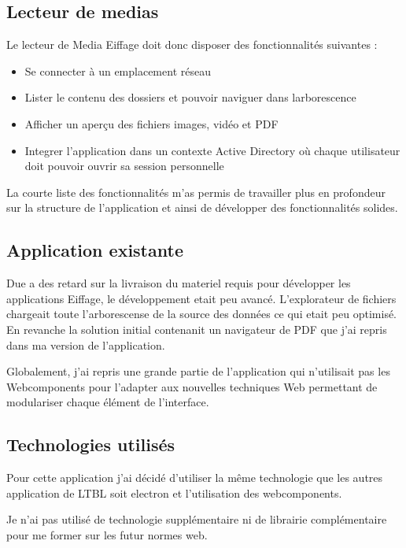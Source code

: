 \clearpage

\subsection{Lecteur de medias}

Le lecteur de Media Eiffage doit donc disposer des fonctionnalités suivantes :

\begin{itemize}
    \item Se connecter à un emplacement réseau
    \item Lister le contenu des dossiers et pouvoir naviguer dans larborescence
    \item Afficher un aperçu des fichiers images, vidéo et PDF
    \item Integrer l'application dans un contexte Active Directory où chaque utilisateur doit pouvoir ouvrir sa session personnelle
\end{itemize}

La courte liste des fonctionnalités m'as permis de travailler plus en profondeur sur la structure de l'application et ainsi de développer des fonctionnalités solides.

\subsection{Application existante}

Due a des retard sur la livraison du materiel requis pour développer les applications Eiffage, le développement etait peu avancé.
L'explorateur de fichiers chargeait toute l'arborescense de la source des données ce qui etait peu optimisé.
En revanche la solution initial contenanit un navigateur de PDF que j'ai repris dans ma version de l'application.

Globalement, j'ai repris une grande partie de l'application qui n'utilisait pas les Webcomponents pour l'adapter aux nouvelles techniques Web permettant de modulariser chaque élément de l'interface.

\subsection{Technologies utilisés}

Pour cette application j'ai décidé d'utiliser la même technologie que les autres application de LTBL soit electron et l'utilisation des webcomponents.

Je n'ai pas utilisé de technologie supplémentaire ni de librairie complémentaire pour me former sur les futur normes web.

